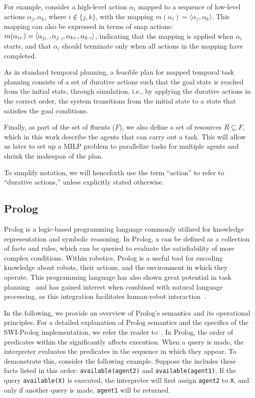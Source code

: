 For example, consider a high-level action $\alpha_i$ mapped to a sequence of low-level actions $\alpha_j, \alpha_k$, where $i \notin \{j, k\}$, with the mapping $m(\alpha_i) = \langle\alpha_j, \alpha_k\rangle$. This mapping can also be expressed in terms of snap actions: $m(\aStart{\alpha_i}) = \langle\aStart{\alpha_j}, \aEnd{\alpha_j}, \aStart{\alpha_k}, \aEnd{\alpha_k}\rangle$, indicating that the mapping is applied when $\alpha_i$ starts, and that $\alpha_i$ should terminate only when all actions in the mapping have completed.

As in standard temporal planning, a feasible plan for mapped temporal task planning consists of a set of durative actions such that the goal state is reached from the initial state, through simulation, i.e., by applying the durative actions in the correct order, the system transitions from the initial state to a state that satisfies the goal conditions.

Finally, as part of the set of fluents ($F$), we also define a set of resources $R\subseteq F$, which in this work describe the agents that can carry out a task. This will allow us later to set up a MILP problem to parallelize tasks for multiple agents and shrink the makespan of the plan.

To simplify notation, we will henceforth use the term ``action'' to refer to ``durative actions,'' unless explicitly stated otherwise.

\subsection{Prolog}

Prolog is a logic-based programming language commonly utilized for knowledge representation and symbolic reasoning.
In Prolog, a \kb can be defined as a collection of facts and rules, which can be queried to evaluate the satisfiability of more complex conditions.
Within robotics, Prolog is a useful tool for encoding knowledge about robots, their actions, and the environment in which they operate.
This programming language has also shown great potential in task planning~\cite{prologPlanning} and has gained interest when combined with natural language processing, as this integration facilitates human-robot interaction~\cite{NLPProlog1,NLPProlog2}.

In the following, we provide an overview of Prolog’s semantics and its operational principles. For a detailed explanation of Prolog semantics and the specifics of the SWI-Prolog implementation, we refer the reader to~\cite{Prolog}. In Prolog, the order of predicates within the \kb significantly affects execution. When a query is made, the interpreter evaluates the predicates in the sequence in which they appear. To demonstrate this, consider the following example.
Suppose the \kb includes these facts listed in this order: \verb|available(agent2)| and \verb|available(agent1)|.
If the query \texttt{available(X)} is executed, the interpreter will first assign \texttt{agent2} to \texttt{X}, and only if another query is made, \texttt{agent1} will be returned.

